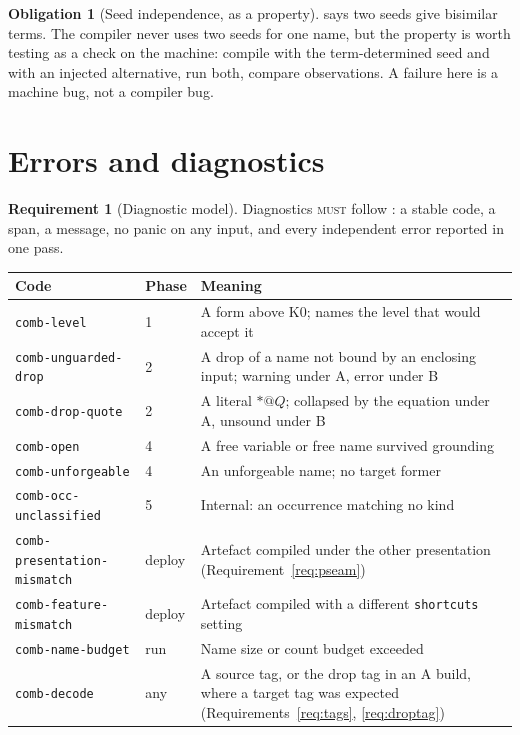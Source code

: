 \documentclass[11pt,a4paper]{article}
\makeatletter
\newcommand{\code}[1]{\texttt{#1}}
\newcommand{\MUST}{\textsc{must}}
\newcommand{\quo}[1]{@#1}
\newcommand{\drp}[1]{{*}#1}
\theoremstyle{definition}
\newtheorem{requirement}[definition]{Requirement}
\newtheorem{obligation}[definition]{Obligation}
\theoremstyle{plain}
\makeatother
\begin{document}
\begin{obligation}[Seed independence, as a property]\label{obl:seedind}
\cite[Lem.~7.8]{draft3} says two seeds give bisimilar terms. The compiler
never uses two seeds for one name, but the property is worth testing as a
check on the machine: compile with the term-determined seed and with an
injected alternative, run both, compare observations. A failure here is a
machine bug, not a compiler bug.
\end{obligation}

\section{Errors and diagnostics}\label{sec:errors}

\begin{requirement}[Diagnostic model]\label{req:diag}
Diagnostics \MUST{} follow \cite[\S9]{k1ndl1ng}: a stable code, a span, a
message, no panic on any input, and every independent error reported in one
pass.
\end{requirement}

\begin{center}
\begin{tabularx}{\linewidth}{@{}ll>{\raggedright\arraybackslash}X@{}}
\toprule
Code & Phase & Meaning\\
\midrule
\code{comb-level} & 1 & A form above K0; names the level that would accept it\\
\code{comb-unguarded-drop} & 2 & A drop of a name not bound by an enclosing
input; warning under A, error under B\\
\code{comb-drop-quote} & 2 & A literal $\drp{\quo{Q}}$; collapsed by the
equation under A, unsound under B\\
\code{comb-open} & 4 & A free variable or free name survived grounding\\
\code{comb-unforgeable} & 4 & An unforgeable name; no target former\\
\code{comb-occ-unclassified} & 5 & Internal: an occurrence matching no kind\\
\code{comb-presentation-mismatch} & deploy & Artefact compiled under the other
presentation (Requirement~\ref{req:pseam})\\
\code{comb-feature-mismatch} & deploy & Artefact compiled with a different
\code{shortcuts} setting\\
\code{comb-name-budget} & run & Name size or count budget exceeded\\
\code{comb-decode} & any & A source tag, or the drop tag in an A build, where
a target tag was expected (Requirements~\ref{req:tags},
\ref{req:droptag})\\
\bottomrule
\end{tabularx}
\end{center}
\end{document}
